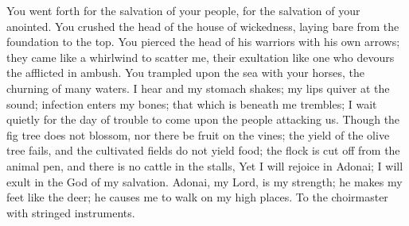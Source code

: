 \begin{biblechapter}
\verse You went forth for the salvation of your people, 
for the salvation of your anointed. 
You crushed the head of the house of wickedness, 
laying bare from the foundation to the top.
\verse You pierced the head of his warriors with his own arrows; 
they came like a whirlwind to scatter me, 
their exultation like one who devours the afflicted in ambush.
\verse You trampled upon the sea with your horses, 
the churning of many waters.
\verse I hear and my stomach shakes; 
my lips quiver at the sound; 
infection enters my bones; 
that which is beneath me trembles; 
I wait quietly for the day of trouble 
to come upon the people attacking us.
\verse Though the fig tree does not blossom, 
nor there be fruit on the vines; 
the yield of the olive tree fails, 
and the cultivated fields do not yield food; 
the flock is cut off from the animal pen, 
and there is no cattle in the stalls,
\verse Yet I will rejoice in Adonai; 
I will exult in the God of my salvation.
\verse Adonai, my Lord, is my strength; 
he makes my feet like the deer; 
he causes me to walk on my high places. 
To the choirmaster with stringed instruments.
\end{biblechapter}

